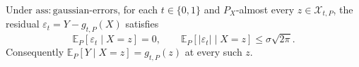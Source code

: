 Under \(\mathrm{ass:gaussian\text{-}errors}\), for each \(t\in\{0,1\}\) and \(P_X\)-almost every \(z\in\mathcal X_{t,P}\), the residual \(\varepsilon_t=Y-g_{t,P}(X)\) satisfies
\[
 \mathbb E_P[\varepsilon_t\mid X=z]=0,\qquad
 \mathbb E_P[|\varepsilon_t|\mid X=z]\le \sigma\sqrt{2\pi}.
\]
Consequently \(\mathbb E_P[Y\mid X=z]=g_{t,P}(z)\) at every such \(z\).